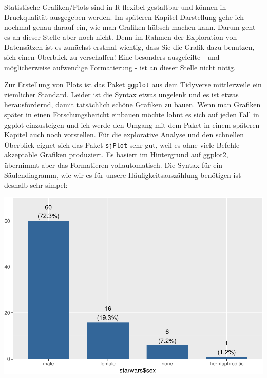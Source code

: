 \documentclass[
]{book}
\newenvironment{Shaded}{\begin{snugshade}}{\end{snugshade}}
\newcommand{\FunctionTok}[1]{\textcolor[rgb]{0.00,0.00,0.00}{#1}}
\newcommand{\NormalTok}[1]{#1}
\newcommand{\SpecialCharTok}[1]{\textcolor[rgb]{0.00,0.00,0.00}{#1}}
\begin{document}
Statistische Grafiken/Plots sind in R flexibel gestaltbar und können in Druckqualität ausgegeben werden. Im späteren Kapitel Darstellung gehe ich nochmal genau darauf ein, wie man Grafiken hübsch machen kann. Darum geht es an dieser Stelle aber noch nicht. Denn im Rahmen der Exploration von Datensätzen ist es zunächst erstmal wichtig, dass Sie die Grafik dazu benutzen, sich einen Überblick zu verschaffen! Eine besonders ausgefeilte - und möglicherweise aufwendige Formatierung - ist an dieser Stelle nicht nötig.

Zur Erstellung von Plots ist das Paket \texttt{ggplot} aus dem Tidyverse mittlerweile ein ziemlicher Standard. Leider ist die Syntax etwas ungelenk und es ist etwas herausfordernd, damit tatsächlich schöne Grafiken zu bauen. Wenn man Grafiken später in einen Forschungsbericht einbauen möchte lohnt es sich auf jeden Fall in ggplot einzusteigen und ich werde den Umgang mit dem Paket in einem späteren Kapitel auch noch vorstellen. Für die explorative Analyse und den schnellen Überblick eignet sich das Paket \texttt{sjPlot} sehr gut, weil es ohne viele Befehle akzeptable Grafiken produziert. Es basiert im Hintergrund auf ggplot2, übernimmt aber das Formatieren vollautomatisch. Die Syntax für ein Säulendiagramm, wie wir es für unsere Häufigkeitsauszählung benötigen ist deshalb sehr simpel:

\begin{Shaded}
\end{Shaded}

\includegraphics{r_book_files/figure-latex/freq_plot-1.pdf}
\end{document}
